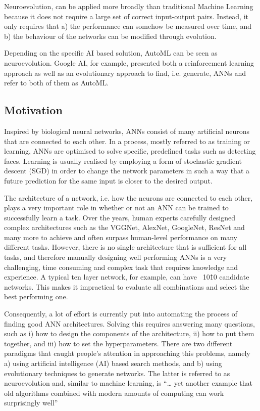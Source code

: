 \documentclass[journal, a4paper]{IEEEtran}
\begin{document}
Neuroevolution, can be applied more broadly than traditional Machine Learning because it does not require a large set of correct input-output pairs. Instead, it only requires that a) the performance can somehow be measured over time, and b) the behaviour of the networks can be modified through evolution. \cite{cite05}

Depending on the specific AI based solution, AutoML can be seen as neuroevolution. Google AI, for example, presented both a reinforcement learning approach as well as an evolutionary approach to find, i.e. generate, ANNs and refer to both of them as AutoML. \cite{cite05}

\subsection{Motivation}

Inspired by biological neural networks, ANNs consist of many artificial neurons that are connected to each other. In a process, mostly referred to as training or learning, ANNs are optimised to solve specific, predefined tasks such as detecting faces. Learning is usually realised by employing a form of stochastic gradient descent (SGD) in order to change the network parameters in such a way that a future prediction for the same input is closer to the desired output. \cite{cite05}

The architecture of a network, i.e. how the neurons are connected to each other, plays a very important role in whether or not an ANN can be trained to successfully learn a task. Over the years, human experts carefully designed complex architectures such as the VGGNet, AlexNet, GoogleNet, ResNet and many more to achieve and often surpass human-level performance on many different tasks. However, there is no single architecture that is sufficient for all tasks, and therefore manually designing well performing ANNs is a very challenging, time consuming and complex task that requires knowledge and experience. A typical ten layer network, for example, can have ~10\^10 candidate networks. This makes it impractical to evaluate all combinations and select the best performing one. \cite{cite05}

Consequently, a lot of effort is currently put into automating the process of finding good ANN architectures. Solving this requires answering many questions, such as i) how to design the components of the architecture, ii) how to put them together, and iii) how to set the hyperparameters. There are two different paradigms that caught people’s attention in approaching this problems, namely a) using artificial intelligence (AI) based search methods, and b) using evolutionary techniques to generate networks. The latter is referred to as neuroevolution and, similar to machine learning, is “… yet another example that old algorithms combined with modern amounts of computing can work surprisingly well” \cite{cite05}
\end{document}
